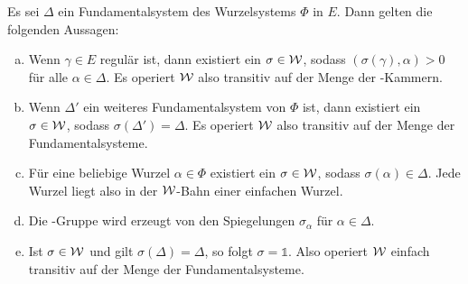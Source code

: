 \begin{thm}
  Es sei $\Delta$ ein Fundamentalsystem des Wurzelsystems $\Phi$ in $E$.
  Dann gelten die folgenden Aussagen:
  \begin{enumerate}[(a)]

    \item Wenn $\gamma \in E$ regulär ist, dann existiert ein $\sigma \in \mathcal{W}$, sodass $(\sigma(\gamma), \alpha) > 0$ für alle $\alpha \in \Delta$. 
      Es operiert $\mathcal{W}$ also transitiv auf der Menge der \weyl\hyp{}Kammern.

    \item Wenn $\Delta'$ ein weiteres Fundamentalsystem von $\Phi$ ist, dann existiert ein $\sigma \in \mathcal{W}$, sodass $\sigma(\Delta') = \Delta$.
      Es operiert $\mathcal{W}$ also transitiv auf der Menge der Fundamentalsysteme.

    \item Für eine beliebige Wurzel $\alpha \in \Phi$ existiert ein $\sigma \in \mathcal{W}$, sodass $\sigma(\alpha) \in \Delta$.
      Jede Wurzel liegt also in der $\mathcal{W}$-Bahn einer einfachen Wurzel.
    \item Die \weyl\hyp{}Gruppe wird erzeugt von den Spiegelungen $\sigma_\alpha$ für $\alpha \in \Delta$.

    \item Ist $\sigma \in \mathcal{W}$ und gilt $\sigma(\Delta) = \Delta$, so folgt $\sigma = \mathds{1}$.
      Also operiert $\mathcal{W}$ einfach transitiv auf der Menge der Fundamentalsysteme.
  \end{enumerate}
\end{thm}

